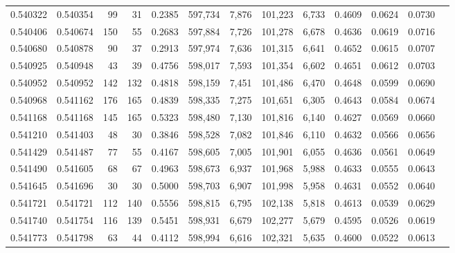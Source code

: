 \begin{tabular}{rrrrrrrrrrrrr}
0.540322 & 0.540354 &    99 &    31 &                                     0.2385 & 597,734 &   7,876 & 101,223 &   6,733 & 0.4609 & 0.0624 & 0.0730 \\
0.540406 & 0.540674 &   150 &    55 &                                     0.2683 & 597,884 &   7,726 & 101,278 &   6,678 & 0.4636 & 0.0619 & 0.0716 \\
0.540680 & 0.540878 &    90 &    37 &                                     0.2913 & 597,974 &   7,636 & 101,315 &   6,641 & 0.4652 & 0.0615 & 0.0707 \\
0.540925 & 0.540948 &    43 &    39 &                                     0.4756 & 598,017 &   7,593 & 101,354 &   6,602 & 0.4651 & 0.0612 & 0.0703 \\
0.540952 & 0.540952 &   142 &   132 &                                     0.4818 & 598,159 &   7,451 & 101,486 &   6,470 & 0.4648 & 0.0599 & 0.0690 \\
0.540968 & 0.541162 &   176 &   165 &                                     0.4839 & 598,335 &   7,275 & 101,651 &   6,305 & 0.4643 & 0.0584 & 0.0674 \\
0.541168 & 0.541168 &   145 &   165 &                                     0.5323 & 598,480 &   7,130 & 101,816 &   6,140 & 0.4627 & 0.0569 & 0.0660 \\
0.541210 & 0.541403 &    48 &    30 &                                     0.3846 & 598,528 &   7,082 & 101,846 &   6,110 & 0.4632 & 0.0566 & 0.0656 \\
0.541429 & 0.541487 &    77 &    55 &                                     0.4167 & 598,605 &   7,005 & 101,901 &   6,055 & 0.4636 & 0.0561 & 0.0649 \\
0.541490 & 0.541605 &    68 &    67 &                                     0.4963 & 598,673 &   6,937 & 101,968 &   5,988 & 0.4633 & 0.0555 & 0.0643 \\
0.541645 & 0.541696 &    30 &    30 &                                     0.5000 & 598,703 &   6,907 & 101,998 &   5,958 & 0.4631 & 0.0552 & 0.0640 \\
0.541721 & 0.541721 &   112 &   140 &                                     0.5556 & 598,815 &   6,795 & 102,138 &   5,818 & 0.4613 & 0.0539 & 0.0629 \\
0.541740 & 0.541754 &   116 &   139 &                                     0.5451 & 598,931 &   6,679 & 102,277 &   5,679 & 0.4595 & 0.0526 & 0.0619 \\
0.541773 & 0.541798 &    63 &    44 &                                     0.4112 & 598,994 &   6,616 & 102,321 &   5,635 & 0.4600 & 0.0522 & 0.0613 \\

\end{tabular}
